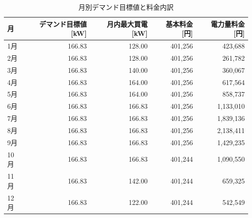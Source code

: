 \documentclass[a4paper,11pt,dvipdfmx]{jsarticle}
\begin{document}
\begin{table}[H]
    \centering
    \caption{月別デマンド目標値と料金内訳}
    \label{tab:monthly_results}
    \begin{tabular}{lrrrr}
        \toprule
        月   & デマンド目標値 [kW] & 月内最大買電 [kW] & 基本料金 [円] & 電力量料金 [円] \\
        \midrule
        1月  & 166.83       & 128.00      & 401,256  & 423,688   \\
        2月  & 166.83       & 128.00      & 401,256  & 261,782   \\
        3月  & 166.83       & 140.00      & 401,256  & 360,067   \\
        4月  & 166.83       & 164.00      & 401,256  & 617,564   \\
        5月  & 166.83       & 164.00      & 401,256  & 858,737   \\
        6月  & 166.83       & 166.83      & 401,256  & 1,133,010 \\
        7月  & 166.83       & 166.83      & 401,256  & 1,839,136 \\
        8月  & 166.83       & 166.83      & 401,256  & 2,138,411 \\
        9月  & 166.83       & 166.83      & 401,256  & 1,429,235 \\
        10月 & 166.83       & 166.83      & 401,244  & 1,090,550 \\
        11月 & 166.83       & 142.00      & 401,244  & 659,325   \\
        12月 & 166.83       & 122.00      & 401,244  & 542,549   \\
        \bottomrule
    \end{tabular}
\end{table}
\end{document}
